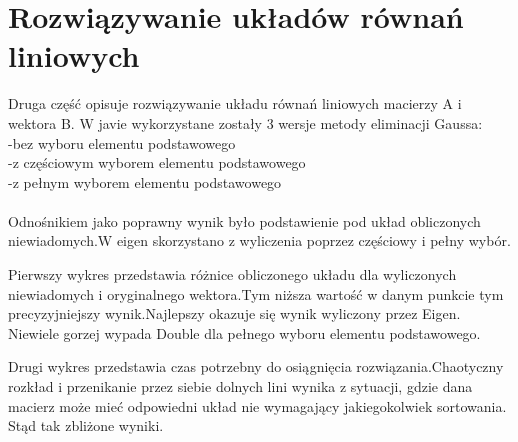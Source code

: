 \documentclass[8pt]{article}
\begin{document}
\section{Rozwiązywanie układów równań liniowych}
Druga część opisuje rozwiązywanie układu równań liniowych macierzy A i wektora B.
W javie wykorzystane zostały 3 wersje metody eliminacji Gaussa:\\
-bez wyboru elementu podstawowego\\
-z częściowym wyborem elementu podstawowego\\
-z pełnym wyborem elementu podstawowego\\
\\
Odnośnikiem jako poprawny wynik było podstawienie pod układ obliczonych niewiadomych.W eigen skorzystano z wyliczenia poprzez częściowy i pełny wybór.

Pierwszy wykres przedstawia różnice obliczonego układu dla wyliczonych niewiadomych i oryginalnego wektora.Tym niższa wartość w danym punkcie tym precyzyjniejszy wynik.Najlepszy okazuje się wynik wyliczony przez Eigen. Niewiele gorzej wypada Double dla pełnego wyboru elementu podstawowego.


\begin{center}
\end{center}

Drugi wykres przedstawia czas potrzebny do osiągnięcia rozwiązania.Chaotyczny rozkład i przenikanie przez siebie dolnych lini wynika z sytuacji, gdzie dana macierz może mieć odpowiedni układ nie wymagający jakiegokolwiek sortowania. Stąd tak zbliżone wyniki.\\
\end{document}
